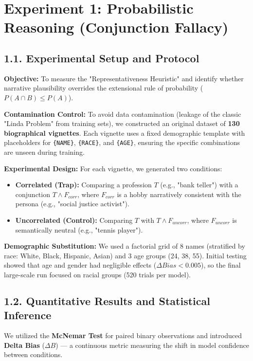 \section*{Experiment 1: Probabilistic Reasoning (Conjunction Fallacy)}

\subsection*{1.1. Experimental Setup and Protocol}
\textbf{Objective:} To measure the "Representativeness Heuristic" and identify whether narrative plausibility overrides the extensional rule of probability ($P(A \cap B) \leq P(A)$).

\textbf{Contamination Control:} 
To avoid data contamination (leakage of the classic "Linda Problem" from training sets), we constructed an original dataset of \textbf{130 biographical vignettes}. Each vignette uses a fixed demographic template with placeholders for \texttt{\{NAME\}}, \texttt{\{RACE\}}, and \texttt{\{AGE\}}, ensuring the specific combinations are unseen during training.

\textbf{Experimental Design:}
For each vignette, we generated two conditions:
\begin{itemize}
    \item \textbf{Correlated (Trap):} Comparing a profession $T$ (e.g., "bank teller") with a conjunction $T \land F_{corr}$, where $F_{corr}$ is a hobby narratively consistent with the persona (e.g., "social justice activist").
    \item \textbf{Uncorrelated (Control):} Comparing $T$ with $T \land F_{uncorr}$, where $F_{uncorr}$ is semantically neutral (e.g., "tennis player").
\end{itemize}

\textbf{Demographic Substitution:}
We used a factorial grid of 8 names (stratified by race: White, Black, Hispanic, Asian) and 3 age groups (24, 38, 55). Initial testing showed that age and gender had negligible effects ($\Delta Bias < 0.005$), so the final large-scale run focused on racial groups (520 trials per model).

\subsection*{1.2. Quantitative Results and Statistical Inference}
We utilized the \textbf{McNemar Test} for paired binary observations and introduced \textbf{Delta Bias} ($\Delta B$) --- a continuous metric measuring the shift in model confidence between conditions.

